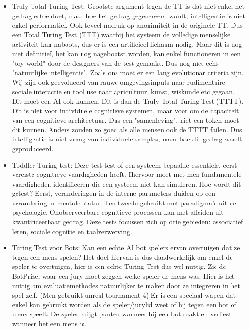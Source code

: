\documentclass[11pt]{article}
\begin{document}
\begin{itemize}
\item Truly Total Turing Test: Grootste argument tegen de TT is dat niet enkel het gedrag ertoe doet, maar hoe het gedrag gegenereerd wordt, intelligentie is niet enkel performatief. Ook teveel nadruk op anonimiteit in de originele TT. Dus een Total Turing Test (TTT) waarbij het systeem de volledige menselijke activiteit kan naboots, dus er is een artificieel lichaam nodig. Maar dit is nog niet definitief, het kan nog nagebootst worden, kan enkel functioneren in een "toy world" door de designers van de test gemaakt. Dus nog niet echt "natuurlijke intelligentie". Zoals ons moet er een lang evolutionar criteria zijn. Wij zijn ook geevolueerd van rauwe omgevingsinputs naar rudimentaire sociale interactie en tool use naar agricultuur, kunst, wiskunde etc gegaan. Dit moet een AI ook kunnen. Dit is dan de Truly Total Turing Test (TTTT). Dit is niet voor individuele cognitieve systemen, maar voor om de capaciteit van een cognitieve architectuur. Dus een "samenleving", niet een token moet dit kunnen. Anders zouden zo goed als alle mensen ook de TTTT failen. Dus intelligentie is niet vraag van individuele samples, maar hoe dit gedrag wordt geproduceerd.
\item Toddler Turing test: Deze test test of een systeem bepaalde essentiele, eerst vereiste cognitieve vaardigheden heeft. Hiervoor moet met men fundamentele vaardigheden identificeren die een systeem niet kan simuleren. Hoe wordt dit getest? Eerst, veranderingen in de interne parameters duiden op een verandering in mentale status. Ten tweede gebruikt met paradigma's uit de psychologie. Onobserveerbare cognitieve processen kan met afleiden uit kwantificeerbaar gedrag. Deze tests focussen zich op drie gebieden: associatief leren, sociale cognitie en taalverwerving.
\item Turing Test voor Bots: Kan een echte AI bot spelers ervan overtuigen dat ze tegen een mens spelen? Het doel hiervan is dus daadwerkelijk om enkel de speler te overtuigen, hier is een echte Turing Test dus wel nuttig. Zie de BotPrize, waar een jury moet zeggen welke speler de mens was. Hier is het nuttig om evaluatiemethodes natuurlijker te maken door ze integreren in het spel zelf. (Men gebruikt unreal tournament 4) Er is een speciaal wapen dat enkel kan gebruikt worden als de speler/jurylid weet of hij tegen een bot of mens speelt. De speler krijgt punten wanneer hij een bot raakt en verliest wanneer het een mens is.
\end{itemize}
\end{document}
